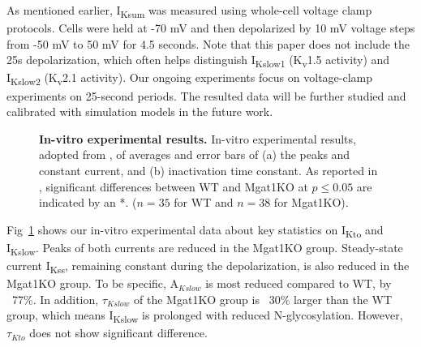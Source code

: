 \documentclass[10pt,letterpaper]{article}
\begin{document}
As mentioned earlier, I\textsubscript{Ksum} was measured using whole-cell voltage clamp protocols. Cells were held at -70 mV and then depolarized by 10 mV voltage steps from -50 mV to 50 mV for 4.5 seconds. Note that this paper does not include the 25s depolarization, which often helps distinguish I\textsubscript{Kslow1} (K\textsubscript{v}1.5 activity) and I\textsubscript{Kslow2} (K\textsubscript{v}2.1 activity). Our ongoing experiments focus on voltage-clamp experiments on 25-second periods. The resulted data will be further studied and calibrated with simulation models in the future work.

\begin{figure}[!ht]
    \centering
    \caption{{\bf In-vitro experimental results.} 
    In-vitro experimental results, adopted from \cite{ednie2019reduced}, of averages and error bars of (a) the peaks and constant current, and (b) inactivation time constant. As reported in \cite{ednie2019reduced}, significant differences between WT and Mgat1KO at $p \leq 0.05$ are indicated by an *. ($n=35$ for WT and $n=38$ for Mgat1KO).}
    \label{fig4}
\end{figure}

Fig~\ref{fig4} shows our in-vitro experimental data about key statistics on I\textsubscript{Kto} and I\textsubscript{Kslow}. Peaks of both currents are reduced in the Mgat1KO group. Steady-state current I\textsubscript{Kss}, remaining constant during the depolarization, is also reduced in the Mgat1KO group. To be specific, $\mathrm{A}_{Kslow}$ is most reduced compared to WT, by ~77\%. In addition, $\tau_{Kslow}$ of the Mgat1KO group is ~30\% larger than the WT group, which means I\textsubscript{Kslow} is prolonged with reduced N-glycosylation. However, $\tau_{Kto}$ does not show significant difference.
\end{document}

